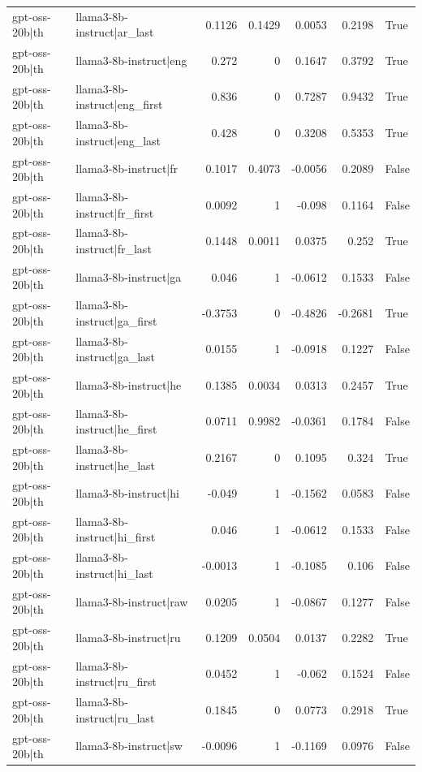 \begin{table}
\begin{tabular}{l l r r r r l}
gpt-oss-20b|th & llama3-8b-instruct|ar_last & 0.1126 & 0.1429 & 0.0053 & 0.2198 & True \\
gpt-oss-20b|th & llama3-8b-instruct|eng & 0.272 & 0 & 0.1647 & 0.3792 & True \\
gpt-oss-20b|th & llama3-8b-instruct|eng_first & 0.836 & 0 & 0.7287 & 0.9432 & True \\
gpt-oss-20b|th & llama3-8b-instruct|eng_last & 0.428 & 0 & 0.3208 & 0.5353 & True \\
gpt-oss-20b|th & llama3-8b-instruct|fr & 0.1017 & 0.4073 & -0.0056 & 0.2089 & False \\
gpt-oss-20b|th & llama3-8b-instruct|fr_first & 0.0092 & 1 & -0.098 & 0.1164 & False \\
gpt-oss-20b|th & llama3-8b-instruct|fr_last & 0.1448 & 0.0011 & 0.0375 & 0.252 & True \\
gpt-oss-20b|th & llama3-8b-instruct|ga & 0.046 & 1 & -0.0612 & 0.1533 & False \\
gpt-oss-20b|th & llama3-8b-instruct|ga_first & -0.3753 & 0 & -0.4826 & -0.2681 & True \\
gpt-oss-20b|th & llama3-8b-instruct|ga_last & 0.0155 & 1 & -0.0918 & 0.1227 & False \\
gpt-oss-20b|th & llama3-8b-instruct|he & 0.1385 & 0.0034 & 0.0313 & 0.2457 & True \\
gpt-oss-20b|th & llama3-8b-instruct|he_first & 0.0711 & 0.9982 & -0.0361 & 0.1784 & False \\
gpt-oss-20b|th & llama3-8b-instruct|he_last & 0.2167 & 0 & 0.1095 & 0.324 & True \\
gpt-oss-20b|th & llama3-8b-instruct|hi & -0.049 & 1 & -0.1562 & 0.0583 & False \\
gpt-oss-20b|th & llama3-8b-instruct|hi_first & 0.046 & 1 & -0.0612 & 0.1533 & False \\
gpt-oss-20b|th & llama3-8b-instruct|hi_last & -0.0013 & 1 & -0.1085 & 0.106 & False \\
gpt-oss-20b|th & llama3-8b-instruct|raw & 0.0205 & 1 & -0.0867 & 0.1277 & False \\
gpt-oss-20b|th & llama3-8b-instruct|ru & 0.1209 & 0.0504 & 0.0137 & 0.2282 & True \\
gpt-oss-20b|th & llama3-8b-instruct|ru_first & 0.0452 & 1 & -0.062 & 0.1524 & False \\
gpt-oss-20b|th & llama3-8b-instruct|ru_last & 0.1845 & 0 & 0.0773 & 0.2918 & True \\
gpt-oss-20b|th & llama3-8b-instruct|sw & -0.0096 & 1 & -0.1169 & 0.0976 & False \\

\end{tabular}
\end{table}
